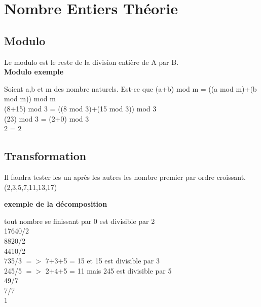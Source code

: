\newpage

\chapter{Nombre Entiers Théorie}
\vspace{3mm} %
\section{Modulo}
\vspace{3mm} %

Le modulo est le reste de la division entière de A par B. \\

\vspace{3mm} %
\textbf{Modulo exemple}
\vspace{3mm} %

Soient a,b et m des nombre naturels. Est-ce que (a+b) mod m = ((a mod m)+(b mod m)) mod m \\

(8+15) mod 3 = ((8 mod 3)+(15 mod 3)) mod 3 \\
(23) mod 3 = (2+0) mod 3 \\
2 = 2

\vspace{3mm} %
\section{Transformation}
\vspace{3mm} %

Il faudra tester les un après les autres les nombre premier par ordre croissant. \\

(2,3,5,7,11,13,17)

\vspace{3mm} %
\textbf{exemple de la décomposition}
\vspace{3mm} %

tout nombre se finissant par 0 est divisible par 2 \\

17640/2 \\
8820/2  \\
4410/2  \\
735/3 $=>$ 7+3+5 = 15 et 15 est divisible par 3 \\
245/5 $=>$ 2+4+5 = 11 mais 245 est divisible par 5 \\
49/7 \\
7/7 \\
1

